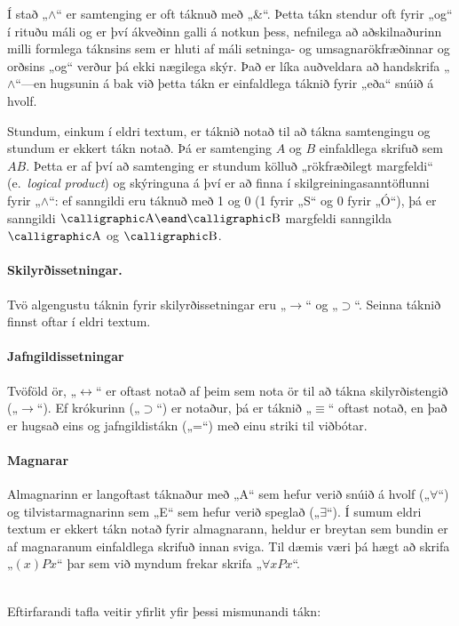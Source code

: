 Í stað „$\wedge$“ er samtenging er oft táknuð með „{\&}“. Þetta tákn stendur oft fyrir „og“ í rituðu máli og er því ákveðinn galli á notkun þess, nefnilega að aðskilnaðurinn milli formlega táknsins sem er hluti af máli setninga- og umsagnarökfræðinnar og orðsins „og“ verður þá ekki nægilega skýr. Það er líka auðveldara að handskrifa „$\wedge$“---en hugsunin á bak við þetta tákn er einfaldlega táknið fyrir „eða“ snúið á hvolf.

Stundum, einkum í eldri textum, er táknið {\scriptsize\textbullet} notað til að tákna samtengingu og stundum er ekkert tákn notað. Þá er samtenging $A$ og $B$ einfaldlega skrifuð sem $AB$. Þetta er af því að samtenging er stundum kölluð  „rökfræðilegt margfeldi“ (e.\ \emph{logical product}) og skýringuna á því er að finna í skilgreiningasanntöflunni fyrir „$\wedge$“: ef sanngildi eru táknuð með 1 og 0 (1 fyrir „S“ og 0 fyrir „Ó“), þá er sanngildi $\meta{A} \eand \meta{B}$ margfeldi sanngilda $\meta{A}$ og $\meta{B}$.

\paragraph{Skilyrðissetningar.} Tvö algengustu táknin fyrir skilyrðissetningar eru „$\rightarrow$“ og „$\supset$“. Seinna táknið finnst oftar í eldri textum.

\paragraph{Jafngildissetningar} Tvöföld ör, „$\leftrightarrow$“ er oftast notað af þeim sem nota ör til að tákna skilyrðistengið („$\rightarrow$“). Ef krókurinn („$\supset$“) er notaður, þá er táknið „$\equiv$“ oftast notað, en það er hugsað eins og jafngildistákn („=“) með einu striki til viðbótar.

\paragraph{Magnarar} Almagnarinn er langoftast táknaður með „A“ sem hefur verið snúið á hvolf („$\forall$“) og tilvistarmagnarinn sem „E“ sem hefur verið speglað („$\exists$“). Í sumum eldri textum er ekkert tákn notað fyrir almagnarann, heldur er breytan sem bundin er af magnaranum einfaldlega skrifuð innan sviga. Til dæmis væri þá hægt að skrifa „$(x)Px$“ þar sem við myndum frekar skrifa „$\forall x Px$“.

\
\\Eftirfarandi tafla veitir yfirlit yfir þessi mismunandi tákn:

